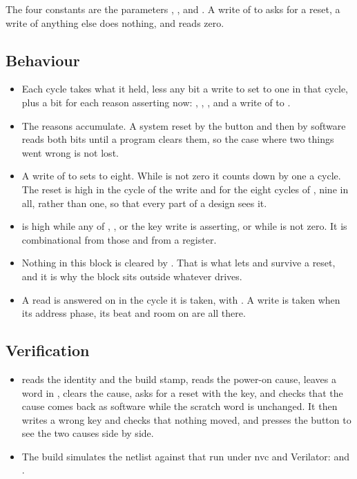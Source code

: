 
The four constants are the parameters , ,
 and . A write of  to 
asks for a reset, a write of anything else does nothing, and
 reads zero.


\subsection*{Behaviour}

\begin{itemize}
\item Each cycle  takes what it held, less any bit a write
to  set to one in that cycle, plus a bit for each reason
asserting now: , , , and a write of
 to .
\item The reasons accumulate. A system reset by the button and then by
software reads both bits until a program clears them, so the case
where two things went wrong is not lost.
\item A write of  to  sets  to eight.
While  is not zero it counts down by one a cycle. The reset
is high in the cycle of the write and for the eight cycles of
, nine in all, rather than one, so that every part of a
design sees it.
\item {} is high while any of , ,
 or the key write is asserting, or while  is not
zero. It is combinational from those and from a register.
\item Nothing in this block is cleared by . That is what
lets  and  survive a reset, and it is why
the block sits outside whatever  drives.
\item A read is answered on  in the cycle it is taken, with
. A write is taken when its address phase, its beat and
room on  are all there.
\end{itemize}

\subsection*{Verification}

\begin{itemize}
\item {} reads the identity and the
build stamp, reads the power-on cause, leaves a word in
, clears the cause, asks for a reset with the key, and
checks that the cause comes back as software while the scratch word is
unchanged. It then writes a wrong key and checks that nothing moved,
and presses the button to see the two causes side by side.
\item The build simulates the netlist against that run under nvc and
Verilator:  and
.
\end{itemize}

